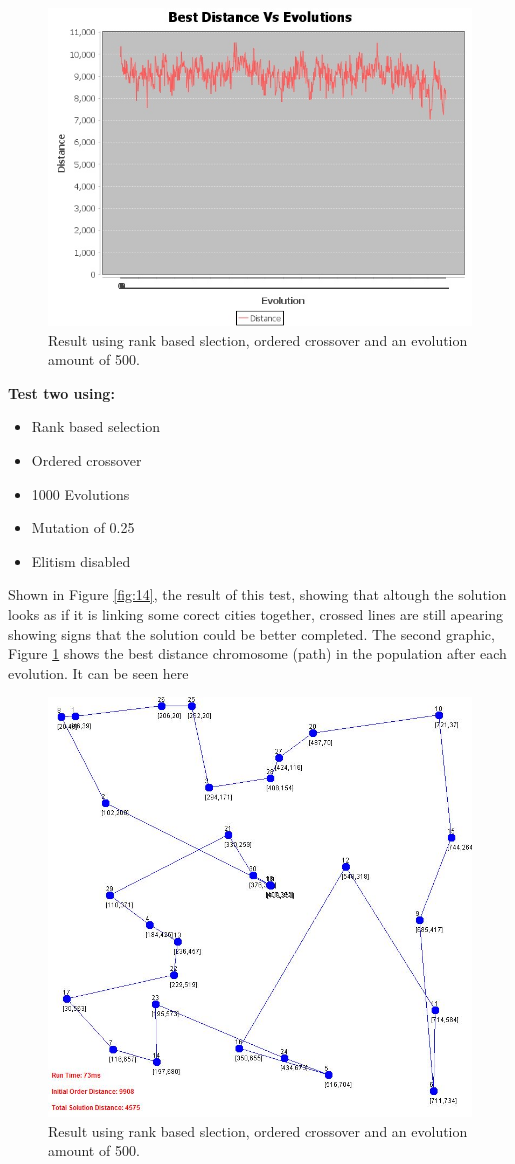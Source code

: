 \documentclass[article]{IEEEtran}
\begin{document}
\begin{figure}[H]
\centering
  \includegraphics[width=.8\linewidth]{images/bestDistances1}
  \caption{Result using rank based slection, ordered crossover and an evolution amount of 500.}
  \label{fig:15}
\end{figure}

\textbf{Test two using:} 
\begin{itemize}
\item Rank based selection
\item Ordered crossover
\item 1000 Evolutions
\item Mutation of 0.25
\item Elitism disabled
\end{itemize} 

Shown in Figure \ref{fig:14}, the result of this test, showing that altough the solution looks as if it is linking some corect cities together, crossed lines are still apearing showing signs that the solution could be better completed. The second graphic, Figure \ref{fig:15} shows the best distance chromosome (path) in the population after each evolution. It can be seen here 

\begin{figure}[H]
\centering
  \includegraphics[width=.8\linewidth]{images/test2}
  \caption{Result using rank based slection, ordered crossover and an evolution amount of 500.}
  \label{fig:16}
\end{figure}
\end{document}
